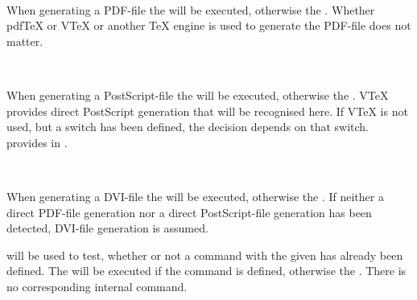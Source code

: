 \begin{Declaration}
  \\
\end{Declaration}
%
%
When generating a PDF-file the  will be executed,
otherwise the . Whether pdf\TeX{} or V\TeX{} or
another \TeX{} engine is used to generate the PDF-file does not matter.
%
%
%


\begin{Declaration}
  \\
\end{Declaration}
%
%
When generating a PostScript-file the  will be
executed, otherwise the . V\TeX{} provides direct
PostScript generation that will be recognised here. If V\TeX{} is not used,
but a switch  has been defined, the decision depends on that
switch. \KOMAScript{} provides  in .
%
%
%


\begin{Declaration}
  \\
\end{Declaration}
%
%
When generating a DVI-file the  will be executed,
otherwise the . If neither a direct PDF-file
generation nor a direct PostScript-file generation has been detected, DVI-file
generation is assumed.
%
%
%


\begin{Declaration}
\end{Declaration}
%
\eTeX{} will be used to test, whether or not a command with the given
 has already been defined. The  will be
executed if the command is defined, otherwise the . There is no corresponding internal command.
%
%


